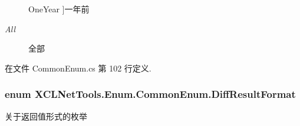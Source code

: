 \begin{Desc}
\begin{description}
{\hypertarget{class_x_c_l_net_tools_1_1_enum_1_1_common_enum_abac0e863746b7fb8e6364c17f61648eaae0e2407272c8d5ee6e131146067c7055}{One\-Year}\label{class_x_c_l_net_tools_1_1_enum_1_1_common_enum_abac0e863746b7fb8e6364c17f61648eaae0e2407272c8d5ee6e131146067c7055}
}]一年前 \item[{\em 
\hypertarget{class_x_c_l_net_tools_1_1_enum_1_1_common_enum_abac0e863746b7fb8e6364c17f61648eaab1c94ca2fbc3e78fc30069c8d0f01680}{All}\label{class_x_c_l_net_tools_1_1_enum_1_1_common_enum_abac0e863746b7fb8e6364c17f61648eaab1c94ca2fbc3e78fc30069c8d0f01680}
}]全部 \end{description}
\end{Desc}


在文件 Common\-Enum.\-cs 第 102 行定义.

\hypertarget{class_x_c_l_net_tools_1_1_enum_1_1_common_enum_aaefa466811a65c8971576fcdb80354a4}{
\subsubsection[{Diff\-Result\-Format}]{\setlength{\rightskip}{0pt plus 5cm}enum {\bf X\-C\-L\-Net\-Tools.\-Enum.\-Common\-Enum.\-Diff\-Result\-Format}}}\label{class_x_c_l_net_tools_1_1_enum_1_1_common_enum_aaefa466811a65c8971576fcdb80354a4}


关于返回值形式的枚举 

